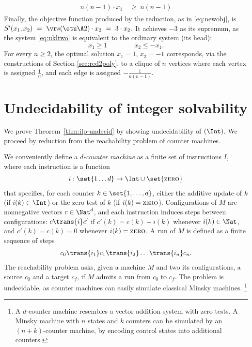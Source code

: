 \begin{slexample}
\begin{align}
\begin{aligned}
n(n-1) \cdot x_1  & \ \geq \ n(n-1)
\end{aligned}
\end{align}
%
Finally, the objective function produced by the reduction, as in \eqref{eq:newobj}, is
$
S'(x_1, x_2) \ = \ \vr s({\otu \A 2}) \cdot x_2 \ = \   3 \cdot x_2.
$
It achieves $-3$ as its supremum,
as the system \eqref{eq:ukltwo} is equivalent to the ordinary system (its head):
\[
x_1 \geq 1 \qquad\qquad x_2 \leq - x_1.
\]
%
For every $n\geq 2$, 
the optimal solution $x_1 = 1$, $x_2 = -1$ corresponds, via the constructions of Section \ref{sec:red2poly},
to a clique of $n$ vertices where each vertex is assigned $\frac 1 n$, 
and each edge is assigned 
$-\frac 1 {n(n-1)}$.
\end{slexample}




\section{Undecidability of integer solvability} \label{sec:ilp-undecid-proof}

\newcommand{\zeroinstr}{\text{\sc zero}}
\newcommand{\updinstr}{\text{\sc upd}}
We prove Theorem~\ref{thm:ilp-undecid} by showing undecidability of \finineqsolvname$(\Int)$.
We proceed by reduction from the reachability problem of counter machines.

We conveniently define a \emph{$d$-counter machine}
as a finite set of instructions $I$, where each instruction is a function
\[
i : \set{1 \ldots d} \to \Int \cup \set{\zeroinstr}
\]
that specifies, for each counter $k\in\set{1,\ldots, d}$, either the additive update of $k$ (if $i(k) \in \Int$)
or the zero-test of $k$ (if $i(k) = \zeroinstr$).
Configurations of $M$ are nonnegative vectors $c\in \Nat^d$, and
each instruction induces steps between configurations: $c \trans {i} c'$ if
$c'(k) = c(k) + i(k)$ whenever $i(k)\in\Nat$, and $c'(k) = c(k) = 0$ whenever $i(k)=\zeroinstr$.
A run of $M$ is defined as a finite sequence of steps
\begin{align} \label{eq:run}
c_0 \trans{i_1} c_1 \trans{i_2} \ldots \trans{i_n} c_n .
\end{align}
The reachability problem asks, given a machine $M$ and two its configurations, a source $c_0$ and
a target $c_f$, if $M$ admits a run from $c_0$ to $c_f$.
The problem is undecidable, as counter machines can easily simulate classical Minsky machines.%
\footnote{A $d$-counter machine resembles a vector addition system with zero tests.
A Minsky machine with $n$ states and $k$ counters can be simulated by an $(n+k)$-counter machine,
by encoding control states into additional counters.
} 

